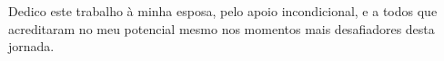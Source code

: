 \begin{dedicatoria}
	\vspace*{\fill}

	\hspace{.45\textwidth}
	\begin{minipage}{.5\textwidth}
		Dedico este trabalho à minha esposa, pelo apoio incondicional, e a todos que acreditaram no meu potencial mesmo nos momentos mais desafiadores desta jornada.
	\end{minipage}%
\end{dedicatoria}
\cleardoublepage